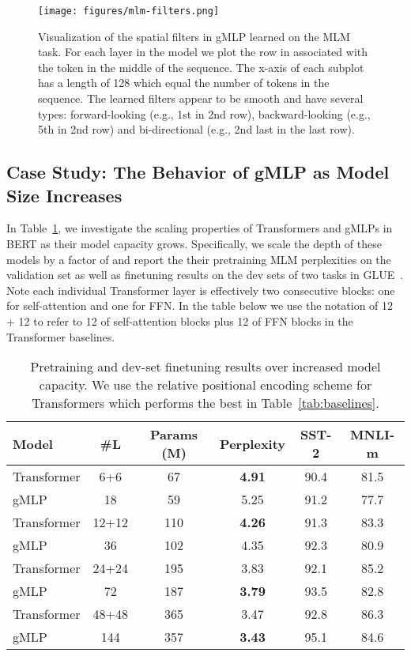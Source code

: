 \documentclass{article}
\newcommand{\gffn}{gMLP\xspace}
\begin{document}
\begin{figure}[h]
    \centering
    \texttt{[image: figures/mlm-filters.png]}
    \caption{Visualization of the spatial filters in \gffn learned on the MLM task. For each layer in the model we plot the row in  associated with the token in the middle of the sequence. The x-axis of each subplot has a length of 128 which equal the number of tokens in the sequence.
    The learned filters appear to be smooth and have several types: forward-looking (e.g., 1st in 2nd row), backward-looking (e.g., 5th in 2nd row) and bi-directional (e.g., 2nd last in the last row).}
    \label{fig:mlm-filters}
    \vspace{-0.2cm}
\end{figure}

\subsection{Case Study: The Behavior of \gffn as Model Size Increases}
\label{sec:scaling}

In Table~\ref{tab:depth-scaling},
we investigate the scaling properties of Transformers and \gffn{s} in BERT as their model capacity grows.
Specifically,
we scale the depth of these models by a factor of  and report the their pretraining MLM perplexities on the validation set as well as finetuning results on the dev sets of two tasks in GLUE~\cite{wang2018glue}.
Note each individual Transformer layer is effectively two consecutive blocks: one for self-attention and one for FFN. In the table below we use the notation of 12 + 12 to refer to 12 of self-attention blocks plus 12 of FFN blocks in the Transformer baselines.

\begin{table}[h]
\centering
\small
\caption{Pretraining and dev-set finetuning results over increased model capacity.
We use the relative positional encoding scheme for Transformers which performs the best in Table~\ref{tab:baselines}.}
\begin{tabular}{@{}l|c|c|c|cc@{}}
\toprule
Model & \#L & Params (M) & Perplexity & SST-2 & MNLI-m \\ \midrule
Transformer & 6+6 & 67 & \textbf{4.91} & 90.4 & 81.5 \\
\gffn  & 18  & 59 & 5.25 & 91.2 & 77.7 \\
\midrule
Transformer  & 12+12  & 110 & \textbf{4.26} & 91.3 & 83.3 \\
\gffn & 36 & 102 & 4.35 & 92.3 & 80.9 \\
\midrule
Transformer  & 24+24 & 195 & 3.83 & 92.1 & 85.2 \\ 
\gffn & 72 & 187 & \textbf{3.79} & 93.5 & 82.8 \\
\midrule
Transformer & 48+48 & 365  & 3.47 & 92.8 & 86.3 \\
\gffn  & 144 & 357 & \textbf{3.43} & 95.1 & 84.6 \\
 \bottomrule
\end{tabular}
\label{tab:depth-scaling}
\vspace{-0.2cm}
\end{table}
\end{document}
